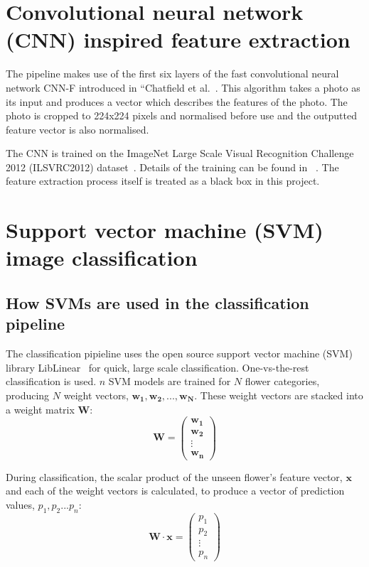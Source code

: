 \documentclass[11pt, a4paper]{report}
\newcommand{\vect}[1]{\boldsymbol{#1}}
\begin{document}
\section{Convolutional neural network (CNN) inspired feature extraction}

The pipeline makes use of the first six layers of the fast convolutional neural network CNN-F introduced in “Chatfield et al.~\cite{Chatfield14}. This algorithm takes a photo as its input and produces a vector which describes the features of the photo. The photo is cropped to 224x224 pixels and normalised before use and the outputted feature vector is also normalised.

The CNN is trained on the ImageNet Large Scale Visual Recognition Challenge 2012 (ILSVRC2012) dataset~\cite{CNN:Imagenet}. Details of the training can be found in ~\cite{Chatfield14}. The feature extraction process itself is treated as a black box in this project. 

 


\section{Support vector machine (SVM) image classification}

\subsection{How SVMs are used in the classification pipeline}

The classification pipieline uses the open source support vector machine (SVM) library LibLinear~\cite{SVM:LibLinear} for quick, large scale classification. One-vs-the-rest classification is used. $n$ SVM models are trained for $N$ flower categories, producing $N$ weight vectors, $\vect{w_{1}}, \vect{w_{2}}, ..., \vect{w_{N}}$. These weight vectors are stacked into a weight matrix $\vect{W}$: 
$$
\vect{W} = 
\begin{pmatrix}
\vect{w_{1}}\\  
\vect{w_{2}}\\ 
\vdots \\ 
\vect{w_{n}}
\end{pmatrix}
$$



During classification, the scalar product of the unseen flower's feature vector, $\vect{x}$ and each of the weight vectors is calculated, to produce a vector of prediction values, $p_{1}, p_{2} ... p_{n}$:
$$
\vect{W} \cdot \vect{x} =
\begin{pmatrix}
p_{1}\\  
p_{2}\\ 
\vdots \\ 
p_{n}
\end{pmatrix}
$$
\end{document}
